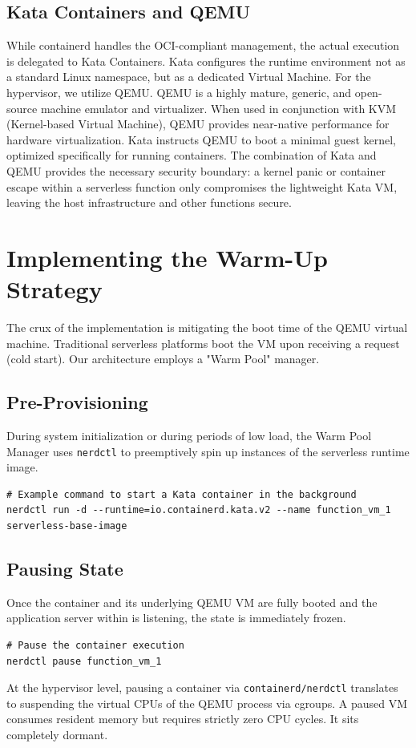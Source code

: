 \documentclass[12pt,a4paper]{report}
\begin{document}
\subsection{Kata Containers and QEMU}
While containerd handles the OCI-compliant management, the actual execution is delegated to Kata Containers. Kata configures the runtime environment not as a standard Linux namespace, but as a dedicated Virtual Machine.
For the hypervisor, we utilize QEMU. QEMU is a highly mature, generic, and open-source machine emulator and virtualizer. When used in conjunction with KVM (Kernel-based Virtual Machine), QEMU provides near-native performance for hardware virtualization. Kata instructs QEMU to boot a minimal guest kernel, optimized specifically for running containers.
The combination of Kata and QEMU provides the necessary security boundary: a kernel panic or container escape within a serverless function only compromises the lightweight Kata VM, leaving the host infrastructure and other functions secure.

\section{Implementing the Warm-Up Strategy}

The crux of the implementation is mitigating the boot time of the QEMU virtual machine. Traditional serverless platforms boot the VM upon receiving a request (cold start). Our architecture employs a "Warm Pool" manager.

\subsection{Pre-Provisioning}
During system initialization or during periods of low load, the Warm Pool Manager uses \texttt{nerdctl} to preemptively spin up instances of the serverless runtime image.
\begin{verbatim}
# Example command to start a Kata container in the background
nerdctl run -d --runtime=io.containerd.kata.v2 --name function_vm_1 serverless-base-image
\end{verbatim}

\subsection{Pausing State}
Once the container and its underlying QEMU VM are fully booted and the application server within is listening, the state is immediately frozen.
\begin{verbatim}
# Pause the container execution
nerdctl pause function_vm_1
\end{verbatim}
At the hypervisor level, pausing a container via \texttt{containerd/nerdctl} translates to suspending the virtual CPUs of the QEMU process via cgroups. A paused VM consumes resident memory but requires strictly zero CPU cycles. It sits completely dormant.
\end{document}
